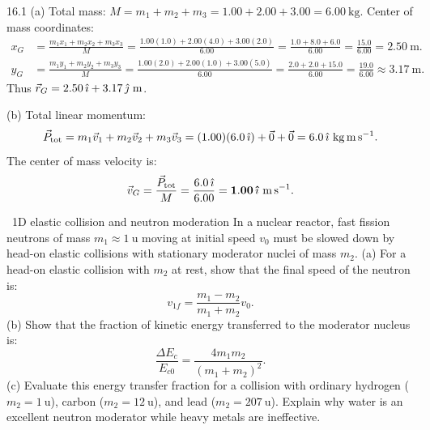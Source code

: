 \begin{solution}{16.1}
(a) Total mass: $M = m_1 + m_2 + m_3 = 1.00 + 2.00 + 3.00 = 6.00\ \mathrm{kg}$.
Center of mass coordinates:
\begin{align*}
x_G &= \frac{m_1 x_1 + m_2 x_2 + m_3 x_3}{M} = \frac{1.00(1.0) + 2.00(4.0) + 3.00(2.0)}{6.00} = \frac{1.0 + 8.0 + 6.0}{6.00} = \frac{15.0}{6.00} = \mathbf{2.50\ \mathrm{m}.} \\
y_G &= \frac{m_1 y_1 + m_2 y_2 + m_3 y_3}{M} = \frac{1.00(2.0) + 2.00(1.0) + 3.00(5.0)}{6.00} = \frac{2.0 + 2.0 + 15.0}{6.00} = \frac{19.0}{6.00} \approx \mathbf{3.17\ \mathrm{m}.}
\end{align*}
Thus $\vec{r}_G = 2.50\,\ihat + 3.17\,\jhat\ \mathrm{m}$.

(b) Total linear momentum:
\[
\vec{P}_{\text{tot}} = m_1\vec{v}_1 + m_2\vec{v}_2 + m_3\vec{v}_3 = (1.00)(6.0\,\hat{\imath}) + \vec{0} + \vec{0} = 6.0\,\hat{\imath}\ \mathrm{kg\,m\,s^{-1}}.
\]
The center of mass velocity is:
\[
\vec{v}_G = \frac{\vec{P}_{\text{tot}}}{M} = \frac{6.0\,\hat{\imath}}{6.00} = \mathbf{1.00\,\hat{\imath}\ \mathrm{m\,s^{-1}}.}
\]
\end{solution}

\begin{exercise}{\warm\ 1D elastic collision and neutron moderation}
In a nuclear reactor, fast fission neutrons of mass $m_1 \approx 1\ \mathrm{u}$ moving at initial speed $v_0$ must be slowed down by head-on elastic collisions with stationary moderator nuclei of mass $m_2$.
(a) For a head-on elastic collision with $m_2$ at rest, show that the final speed of the neutron is:
\[
v_{1f} = \frac{m_1 - m_2}{m_1 + m_2}v_0.
\]
(b) Show that the fraction of kinetic energy transferred to the moderator nucleus is:
\[
\frac{\Delta E_c}{E_{c0}} = \frac{4 m_1 m_2}{(m_1 + m_2)^2}.
\]
(c) Evaluate this energy transfer fraction for a collision with ordinary hydrogen ($m_2 = 1\ \mathrm{u}$), carbon ($m_2 = 12\ \mathrm{u}$), and lead ($m_2 = 207\ \mathrm{u}$). Explain why water is an excellent neutron moderator while heavy metals are ineffective.
\end{exercise}

\begin{tabletworkspace}[5.5cm]
\end{tabletworkspace}

